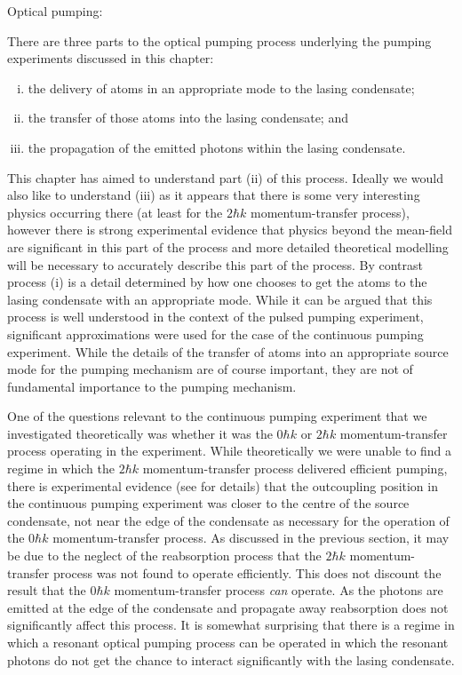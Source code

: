 Optical pumping:

There are three parts to the optical pumping process underlying the pumping experiments discussed in this chapter:
\begin{enumerate}[(i)]
    \item the delivery of atoms in an appropriate mode to the lasing condensate;
    \item the transfer of those atoms into the lasing condensate; and
    \item the propagation of the emitted photons within the lasing condensate.
\end{enumerate}
This chapter has aimed to understand part (ii) of this process.  Ideally we would also like to understand (iii) as it appears that there is some very interesting physics occurring there (at least for the $2 \hbar k$ momentum-transfer process), however there is strong experimental evidence that physics beyond the mean-field are significant in this part of the process and more detailed theoretical modelling will be necessary to accurately describe this part of the process.  By contrast process (i) is a detail determined by how one chooses to get the atoms to the lasing condensate with an appropriate mode.  While it can be argued that this process is well understood in the context of the pulsed pumping experiment, significant approximations were used for the case of the continuous pumping experiment.  While the details of the transfer of atoms into an appropriate source mode for the pumping mechanism are of course important, they are not of fundamental importance to the pumping mechanism.

One of the questions relevant to the continuous pumping experiment that we investigated theoretically was whether it was the $0 \hbar k$ or $2 \hbar k$ momentum-transfer process operating in the experiment.  While theoretically we were unable to find a regime in which the $2 \hbar k$ momentum-transfer process delivered efficient pumping, there is experimental evidence (see \citep{Doring:2009} for details) that the outcoupling position in the continuous pumping experiment was closer to the centre of the source condensate, not near the edge of the condensate as necessary for the operation of the $0 \hbar k$ momentum-transfer process.  As discussed in the previous section, it may be due to the neglect of the reabsorption process that the $2 \hbar k$ momentum-transfer process was not found to operate efficiently.  This does not discount the result that the $0 \hbar k$ momentum-transfer process \emph{can} operate.  As the photons are emitted at the edge of the condensate and propagate away reabsorption does not significantly affect this process.  It is somewhat surprising that there is a regime in which a resonant optical pumping process can be operated in which the resonant photons do not get the chance to interact significantly with the lasing condensate.

